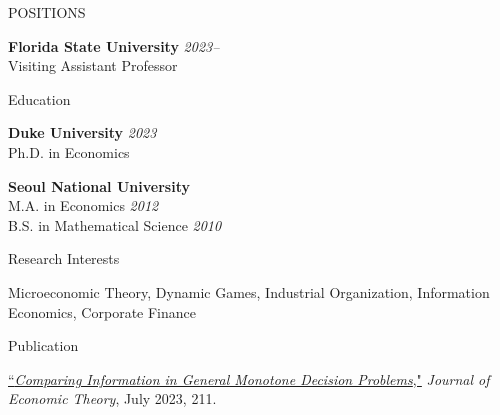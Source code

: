 


\medskip
\address{P.O. Box 3062160, 113 Collegiate Loop, Tallahassee, Florida, 32306-2160}  

\address{ \href{mailto:ykim22@fsu.edu}{ykim22@fsu.edu} \\ \href{https://sites.google.com/view/yonggyun-yg-kim/}{https://sites.google.com/view/yonggyun-yg-kim} } 
\address{Department of Economics	Florida State University}  




\begin{rSection}{POSITIONS}
	
	{\bf Florida State University} \hfill 
	{\em 2023--} 
	\\ 
	Visiting Assistant Professor \smallskip
	
	
\end{rSection}
\medskip

\begin{rSection}{Education}
	
	{\bf Duke University} \hfill 
	{\em 2023 } 
	\\ 
	Ph.D. in Economics \smallskip
		
	{\bf Seoul National University} \hfill 
	\\
	M.A. in Economics
	\hfill {\em 2012 }
	\\
	B.S. in Mathematical Science
	\hfill {\em 2010 }
	
\end{rSection}
\medskip

\begin{rSection}{Research Interests}
	
	Microeconomic Theory, 
	Dynamic Games, 
	Industrial Organization,
	Information Economics, 
	Corporate Finance
	
\end{rSection}


\medskip


\begin{rSection}{Publication}
	
	\begin{etaremune}
		\item \href{https://yonggyun-yg-kim.github.io/files/Research%20papers/GMDP_JET.pdf}{``\textit{Comparing Information in General Monotone Decision Problems},"} 
		\textit{Journal of Economic Theory}, July 2023, 211. 
		
	\end{etaremune}
	
	
	
\end{rSection}

